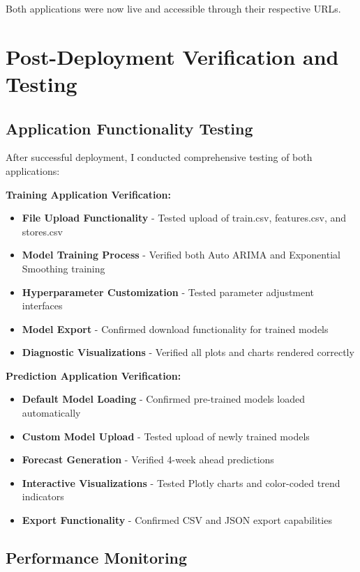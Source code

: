 Both applications were now live and accessible through their respective URLs.

\section{Post-Deployment Verification and Testing}

\subsection{Application Functionality Testing}

After successful deployment, I conducted comprehensive testing of both applications:

\textbf{Training Application Verification:}
\begin{itemize}
\item \textbf{File Upload Functionality} - Tested upload of train.csv, features.csv, and stores.csv
\item \textbf{Model Training Process} - Verified both Auto ARIMA and Exponential Smoothing training
\item \textbf{Hyperparameter Customization} - Tested parameter adjustment interfaces
\item \textbf{Model Export} - Confirmed download functionality for trained models
\item \textbf{Diagnostic Visualizations} - Verified all plots and charts rendered correctly
\end{itemize}

\textbf{Prediction Application Verification:}
\begin{itemize}
\item \textbf{Default Model Loading} - Confirmed pre-trained models loaded automatically
\item \textbf{Custom Model Upload} - Tested upload of newly trained models
\item \textbf{Forecast Generation} - Verified 4-week ahead predictions
\item \textbf{Interactive Visualizations} - Tested Plotly charts and color-coded trend indicators
\item \textbf{Export Functionality} - Confirmed CSV and JSON export capabilities
\end{itemize}

\subsection{Performance Monitoring}

